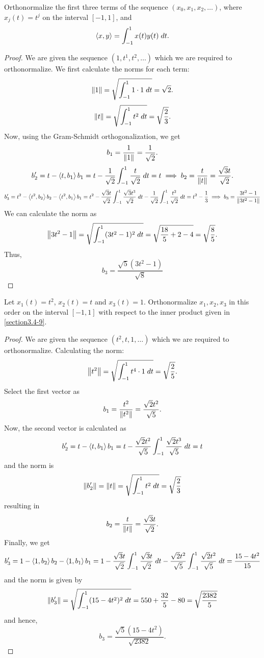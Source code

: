 \begin{question}
   Orthonormalize the first three terms of the sequence $(x_0 , x_1 , x_2 , \ldots)$, where $x_j(t) = t^j$ on the interval $[-1,1]$, and
   \[\left\langle x , y \right\rangle = \int_{-1}^{1} x(t) y(t) \; dt.\]
    \label{section3.4-9}
\end{question}
\begin{proof}
    We are given the sequence $(1 , t^1 , t^2 , \ldots)$ which we are required to orthonormalize. We first calculate the norms for each term:
    \[\left\lVert 1 \right\rVert = \sqrt{\int_{-1}^{1} 1 \cdot 1 \; dt} = \sqrt{2}.\]
    \[\left\lVert t \right\rVert = \sqrt{\int_{-1}^{1} t^2 \; dt} = \sqrt{\frac{2}{{3}}}.\]
    Now, using the Gram-Schmidt orthogonalization, we get
    \[b_1 = \frac{1}{\left\lVert 1 \right\rVert} = \frac{1}{\sqrt{2}}.\]
    \[b_2^\prime = t - \left\langle t , b_1 \right\rangle b_1 = t -  \frac{1}{\sqrt{2}} \int_{-1}^{1} \frac{t}{\sqrt{2}} \; dt = t \implies b_2 = \frac{t}{\left\lVert t \right\rVert} = \frac{\sqrt{3}t}{\sqrt{2}}. \]
    \[b_3^\prime = t^2 - \left\langle t^2 , b_2 \right\rangle b_2 - \left\langle t^2 , b_1 \right\rangle b_1 = t^2 -  \frac{\sqrt{3}t}{\sqrt{2}} \int_{-1}^{1} \frac{\sqrt{3}t^3}{\sqrt{2}} \; dt - \frac{1}{\sqrt{2}} \int_{-1}^{1} \frac{t^2}{\sqrt{2}} \; dt = t^2 - \frac{1}{3} \implies b_3 = \frac{3 t^2 - 1}{\left\lVert 3t^2 - 1 \right\rVert}\]
    We can calculate the norm as
    \[\left\lVert 3t^2 - 1 \right\rVert = \sqrt{\int_{-1}^{1} (3t^2 - 1)^2 \; dt} = \sqrt{\frac{18}{5} + 2 - 4} = \sqrt\frac{8}{5}.\]
    Thus, 
    \[b_3 = \frac{\sqrt{5} (3 t^2 - 1)}{\sqrt{8}}\]
    
\end{proof}

\begin{question}
    Let $x_1(t) = t^2$, $x_2(t) = t$ and $x_3(t) = 1$. Orthonormalize $x_1 , x_2 , x_3$ in this order on the interval $[-1,1]$ with respect to the inner product given in \ref{section3.4-9}.
    \label{section3.4-10}
\end{question}
\begin{proof}
    We are given the sequence $(t^2 , t , 1 , \ldots)$ which we are required to orthonormalize. Calculating the norm:
    \[\left\lVert t^2 \right\rVert = \sqrt{\int_{-1}^{1} t^4 \cdot 1 \; dt} = \sqrt\frac{2}{5}.\]
    Select the first vector as
    \[b_1 = \frac{t^2}{\left\lVert t^2 \right\rVert} = \frac{\sqrt{2} t^2}{\sqrt{5}}.\]
    Now, the second vector is calculated as
    \[b_2^\prime = t - \left\langle t , b_1 \right\rangle b_1 = t - \frac{\sqrt{2} t^2}{\sqrt{5}} \int_{-1}^{1} \frac{\sqrt{2} t^3}{\sqrt{5}} \; dt = t\]
    and the norm is
    \[\left\lVert b_2^\prime \right\rVert = \left\lVert t \right\rVert = \sqrt{\int_{-1}^{1} t^2 \; dt }= \sqrt\frac{2}{3}\]
    resulting in 
    \[b_2 = \frac{t}{\left\lVert t \right\rVert} = \frac{\sqrt{3}t}{\sqrt{2}}.\]
    Finally, we get
    \[b_3^\prime = 1 - \left\langle 1 , b_2 \right\rangle b_2 - \left\langle 1 , b_1 \right\rangle{b_1} = 1 - \frac{\sqrt{3}t}{\sqrt{2}}\int_{-1}^{1} \frac{\sqrt{3}t}{\sqrt{2}} \;dt - \frac{\sqrt{2} t^2}{\sqrt{5}} \int_{-1}^1 \frac{\sqrt{2} t^2}{\sqrt{5}} \; dt = \frac{15- 4t^2}{15}\]
    and the norm is given by 
    \[\left\lVert b_3^\prime \right\rVert = \sqrt{\int_{-1}^1 (15-4t^2)^2 \; dt} = 550 + \frac{32}{5} - 80 = \sqrt\frac{2382}{5}\]
    and hence, 
    \[b_3 = \frac{\sqrt{5}(15-4t^2)}{\sqrt{2382}}.\]
\end{proof}
